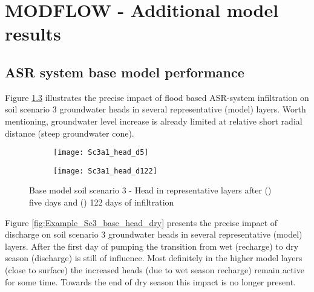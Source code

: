\chapter{MODFLOW - Additional model results}
\label{chapter:MODFLOW_additional}

\section{ASR system base model performance}
\label{section:base_performance}

Figure \ref{fig:Example_Sc3_base_head_wet} illustrates the precise impact of flood based ASR-system infiltration on soil scenario 3 groundwater heads in several representative (model) layers. Worth mentioning, groundwater level increase is already limited at relative short radial distance (steep groundwater cone).   

\begin{figure}[h!]
	\centering
	\begin{subfigure}[b]{0.5\linewidth}
		\centering\texttt{[image: Sc3a1\_head\_d5]}
		\captionsetup{justification=centering}		
		\caption{\label{fig:Sc3a1_head_d5}}
		\end{subfigure}\hfill
	\begin{subfigure}[b]{0.5\linewidth}
        \centering\texttt{[image: Sc3a1\_head\_d122]}
		\captionsetup{justification=centering}		
		\caption{\label{fig:Sc3a1_head_d122}}
		\end{subfigure}
		\captionsetup{justification=centering}	
	\caption{Base model soil scenario 3 - Head in representative layers after () five days and () 122 days of infiltration} 
	\label{fig:Example_Sc3_base_head_wet}
\end{figure} 

Figure \ref{fig:Example_Sc3_base_head_dry} presents the precise impact of discharge on soil scenario 3 groundwater heads in several representative (model) layers. After the first day of pumping the transition from wet (recharge) to dry season (discharge) is still of influence. Most definitely in the higher model layers (close to surface) the increased heads (due to wet season recharge) remain active for some time. Towards the end of dry season this impact is no longer present.


